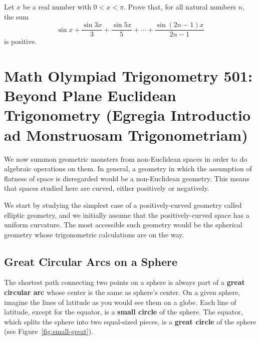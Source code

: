 \documentclass[12pt,a4paper]{memoir}
\theoremstyle{definition}
\begin{document}
\begin{question} 
	Let $x$ be a real number with $0<x<\pi$. Prove that, for all natural numbers $n$, the sum $$\sin x + \frac{\sin 3x}{3} + \frac{\sin 5x}{5}+\cdots+ \frac{\sin (2n-1)x}{2n-1}$$ is positive.
\end{question}


\newpage

\section{Math Olympiad Trigonometry 501:  Beyond Plane Euclidean Trigonometry (Egregia Introductio ad Monstruosam Trigonometriam)}\label{sec:MonsterTrigonometry}

We now summon geometric monsters from non-Euclidean spaces in order to do algebraic operations on them. In general, a geometry in which the assumption of flatness of space is disregarded would be a non-Euclidean geometry. This means that spaces studied here are curved, either positively or negatively.

We start by studying the simplest case of a positively-curved geometry called elliptic geometry, and we initially assume that the positively-curved space has a uniform curvature. The most accessible such geometry would be the spherical geometry whose trigonometric calculations are on the way. 

\subsection{Great Circular Arcs on a Sphere}
		The shortest path connecting two points on a sphere is always part of a \textbf{great circular arc} whose center is the same as sphere's center. On a given sphere, imagine the lines of latitude as you would see them on a globe. Each line of latitude, except for the equator, is a \textbf{small circle} of the sphere. The equator, which splits the sphere into two equal-sized pieces, is a \textbf{great circle} of the sphere (see Figure~\ref{fig:small-great}).
	
\end{document}
